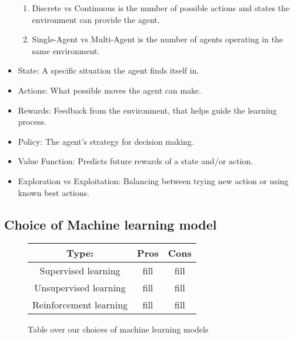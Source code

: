 \begin{itemize}
\begin{enumerate}
                  \item Discrete vs Continuous is the number of possible actions and states the environment can provide the agent.
                  \item Single-Agent vs Multi-Agent is the number of agents operating in the same environment.
            \end{enumerate}
      \item State: A specific situation the agent finds itself in.
      \item Actions: What possible moves the agent can make.
      \item Rewards: Feedback from the environment, that helps guide the learning process.
      \item Policy: The agent's strategy for decision making.
      \item Value Function: Predicts future rewards of a state and/or action.
      \item Exploration vs Exploitation: Balancing between trying new action or using known best actions.
\end{itemize}

\subsection{Choice of Machine learning model}

\begin{figure}[h]
      \centering
      \begin{tabular}{ |c|c|c| }
            \hline
            Type: & Pros & Cons \\
            \hline
            Supervised learning     & fill & fill \\
            \hline
            Unsupervised learning   & fill & fill \\
            \hline
            Reinforcement learning  & fill & fill \\
            \hline 
      \end{tabular}      
      \caption{Table over our choices of machine learning models}
      \label{tab:ML-Models}
\end{figure}


